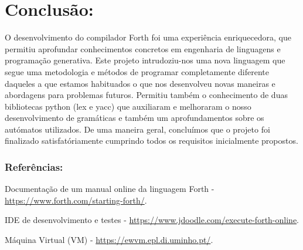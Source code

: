 \documentclass{article}
\begin{document}
    \vspace{1cm}
    

\section*{Conclusão:}
    \vspace{0.5cm}

    O desenvolvimento do compilador Forth foi uma experiência enriquecedora, que permitiu aprofundar conhecimentos concretos em engenharia de linguagens e programação generativa. 
    Este projeto intrudoziu-nos uma nova linguagem que segue uma metodologia e 
    métodos de programar completamente diferente daqueles a que estamos habituados o que nos desenvolveu novas maneiras e abordagens para problemas futuros.
    Permitiu também o conhecimento de duas bibliotecas python (lex e yacc) que auxiliaram e melhoraram o nosso desenvolvimento de gramáticas e também um aprofundamentos sobre os autómatos utilizados.
    De uma maneira geral, concluímos que o projeto foi finalizado satisfatóriamente cumprindo todos os requisitos inicialmente propostos.
    
   
    \vspace{1cm}

\subsubsection*{Referências:}
    \vspace{0.5cm}

    Documentação de um manual online da linguagem Forth - \href{https://www.forth.com/starting-forth/}{https://www.forth.com/starting-forth/}.

    IDE de desenvolvimento e testes - \href{https://www.jdoodle.com/execute-forth-online}{https://www.jdoodle.com/execute-forth-online}.
    
    Máquina Virtual (VM) - \href{https://ewvm.epl.di.uminho.pt/}{https://ewvm.epl.di.uminho.pt/}.

    

    \vspace{1cm}
\end{document}

